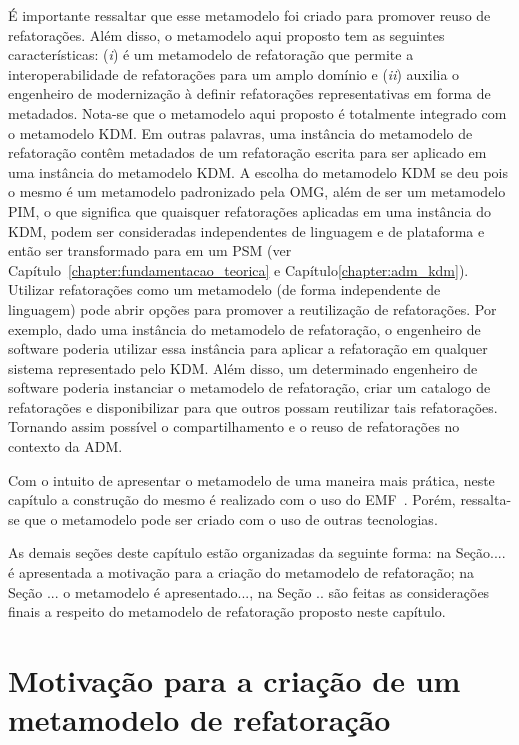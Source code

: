 É importante ressaltar que esse metamodelo foi criado para promover reuso de refatorações. Além disso, o metamodelo aqui proposto tem as seguintes características: (\textit{i}) é um metamodelo de refatoração que permite a interoperabilidade de refatorações para um amplo domínio e (\textit{ii}) auxilia o engenheiro de modernização à definir refatorações representativas em forma de metadados. Nota-se que o metamodelo aqui proposto é totalmente integrado com o metamodelo KDM. Em outras palavras, uma instância do metamodelo de refatoração contêm metadados de um refatoração escrita para ser aplicado em uma instância do metamodelo KDM. A escolha do metamodelo KDM se deu pois o mesmo é um metamodelo padronizado pela OMG, além de ser um metamodelo PIM, o que significa que quaisquer refatorações aplicadas em uma instância do KDM, podem ser consideradas independentes de linguagem e de plataforma e então ser transformado para em um PSM (ver Capítulo~\ref{chapter:fundamentacao_teorica} e Capítulo\ref{chapter:adm_kdm}). Utilizar refatorações como um metamodelo (de forma independente de linguagem) pode abrir opções para promover a reutilização de refatorações. Por exemplo, dado uma instância do metamodelo de refatoração, o engenheiro de software poderia utilizar essa instância para aplicar a refatoração em qualquer sistema representado pelo KDM. Além disso, um determinado engenheiro de software poderia instanciar o metamodelo de refatoração, criar um catalogo de refatorações e disponibilizar para que outros possam reutilizar tais refatorações. Tornando assim possível o compartilhamento e o reuso de refatorações no contexto da ADM.

Com o intuito de apresentar o metamodelo de uma maneira mais prática, neste capítulo a construção do mesmo é realizado com o uso do EMF~\cite{EMF}. Porém, ressalta-se que o metamodelo pode ser criado com o uso de outras tecnologias.

As demais seções deste capítulo estão organizadas da seguinte forma: na Seção.... é apresentada a motivação para a criação do metamodelo de refatoração; na Seção ... o metamodelo é apresentado..., na Seção .. são feitas as considerações finais a respeito do metamodelo de refatoração proposto neste capítulo.

\section{Motivação para a criação de um metamodelo de refatoração} %
\label{sec:motiva_o_para_a_cria_o_de_um_meta_modelo_de_refatora_o}

